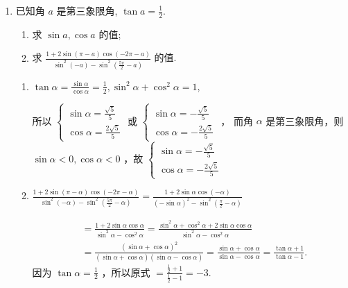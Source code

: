 \begin{enumerate}
\item 已知角 $a$ 是第三象限角, $\tan a=\frac{1}{2}$.
\begin{enumerate}
    \item 求 $\sin a, \cos a$ 的值;
    \item 求 $\frac{1+2 \sin (\pi-a) \cos (-2 \pi-a)}{\sin ^2(-a)-\sin ^2\left(\frac{5 \pi}{2}-a\right)}$ 的值.
\end{enumerate}
\begin{jieda}
\begin{enumerate}
    \item $\tan \alpha=\frac{\sin \alpha}{\cos \alpha}=\frac{1}{2}, \sin ^2 \alpha+\cos ^2 \alpha=1$,

所以 $\left\{\begin{array}{l}\sin \alpha=\frac{\sqrt{5}}{5} \\ \cos \alpha=\frac{2 \sqrt{5}}{5}\end{array}\right.$ 或 $\left\{\begin{array}{l}\sin \alpha=-\frac{\sqrt{5}}{5} \\ \cos \alpha=-\frac{2 \sqrt{5}}{5}\end{array}\right.$ ，
而角 $\alpha$ 是第三象限角，则 $\sin \alpha<0, \cos \alpha<0$ ，故 $\left\{\begin{array}{l}\sin \alpha=-\frac{\sqrt{5}}{5} \\ \cos \alpha=-\frac{2 \sqrt{5}}{5}\end{array}\right.$

\item $\frac{1+2 \sin (\pi-\alpha) \cos (-2 \pi-\alpha)}{\sin ^2(-\alpha)-\sin ^2\left(\frac{5 \pi}{2}-\alpha\right)}=\frac{1+2 \sin \alpha \cos (-\alpha)}{(-\sin \alpha)^2-\sin ^2\left(\frac{\pi}{2}-\alpha\right)}$

$$
\begin{aligned}
& =\frac{1+2 \sin \alpha \cos \alpha}{\sin ^2 \alpha-\cos ^2 \alpha}=\frac{\sin ^2 \alpha+\cos ^2 \alpha+2 \sin \alpha \cos \alpha}{\sin ^2 \alpha-\cos ^2 \alpha} \\
& =\frac{(\sin \alpha+\cos \alpha)^2}{(\sin \alpha+\cos \alpha)(\sin \alpha-\cos \alpha)}=\frac{\sin \alpha+\cos \alpha}{\sin \alpha-\cos \alpha}=\frac{\tan \alpha+1}{\tan \alpha-1} .
\end{aligned}
$$
因为 $\tan \alpha=\frac{1}{2}$ ，所以原式 $=\frac{\frac{1}{2}+1}{\frac{1}{2}-1}=-3$.
\end{enumerate}
\end{jieda}


\end{enumerate}

